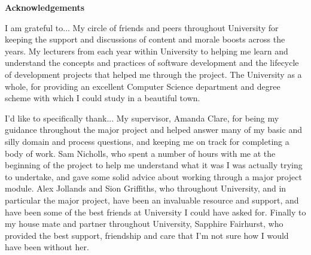 \thispagestyle{empty}

\begin{center}
    {\LARGE\bf Acknowledgements}
\end{center}

I am grateful to...
\newline
My circle of friends and peers throughout University for keeping the support and discussions of content and morale boosts across the years.
\newline
My lecturers from each year within University to helping me learn and understand the concepts and practices of software development and the lifecycle of development projects that helped me through the project.
\newline
The University as a whole, for providing an excellent Computer Science department and degree scheme with which I could study in a beautiful town.

I'd like to specifically thank...
\newline
My supervisor, Amanda Clare, for being my guidance throughout the major project and helped answer many of my basic and silly domain and process questions, and keeping me on track for completing a body of work.
\newline
Sam Nicholls, who spent a number of hours with me at the beginning of the project to help me understand what it was I was actually trying to undertake, and gave some solid advice about working through a major project module.
\newline
Alex Jollands and Sion Griffiths, who throughout University, and in particular the major project, have been an invaluable resource and support, and have been some of the best friends at University I could have asked for.
\newline
Finally to my house mate and partner throughout University, Sapphire Fairhurst, who provided the best support, friendship and care that I'm not sure how I would have been without her.

